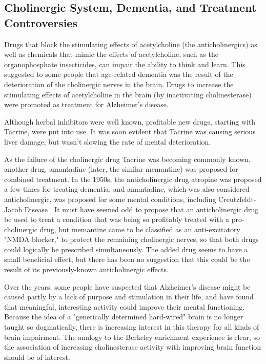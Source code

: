 \documentclass{article}
\begin{document}
\subsection{Cholinergic System, Dementia, and Treatment Controversies}
Drugs that block the stimulating effects of acetylcholine (the anticholinergics) as well as chemicals that mimic the effects of acetylcholine, such as the organophosphate insecticides, can impair the ability to think and learn. This suggested to some people that age-related dementia was the result of the deterioration of the cholinergic nerves in the brain. Drugs to increase the stimulating effects of acetylcholine in the brain (by inactivating cholinesterase) were promoted as treatment for Alzheimer's disease.

Although herbal inhibitors were well known, profitable new drugs, starting with Tacrine, were put into use. It was soon evident that Tacrine was causing serious liver damage, but wasn't slowing the rate of mental deterioration.

As the failure of the cholinergic drug Tacrine was becoming commonly known, another drug, amantadine (later, the similar memantine) was proposed for combined treatment. In the 1950s, the anticholinergic drug atropine was proposed a few times for treating dementia, and amantadine, which was also considered anticholinergic, was proposed for some mental conditions, including Creutzfeldt-Jacob Disease \cite{Sanders1973}. It must have seemed odd to propose that an anticholinergic drug be used to treat a condition that was being so profitably treated with a pro-cholinergic drug, but memantine came to be classified as an anti-excitatory "NMDA blocker," to protect the remaining cholinergic nerves, so that both drugs could logically be prescribed simultaneously. The added drug seems to have a small beneficial effect, but there has been no suggestion that this could be the result of its previously-known anticholinergic effects.

Over the years, some people have suspected that Alzheimer's disease might be caused partly by a lack of purpose and stimulation in their life, and have found that meaningful, interesting activity could improve their mental functioning. Because the idea of a "genetically determined hard-wired" brain is no longer taught so dogmatically, there is increasing interest in this therapy for all kinds of brain impairment. The analogy to the Berkeley enrichment experience is clear, so the association of increasing cholinesterase activity with improving brain function should be of interest.
\end{document}
